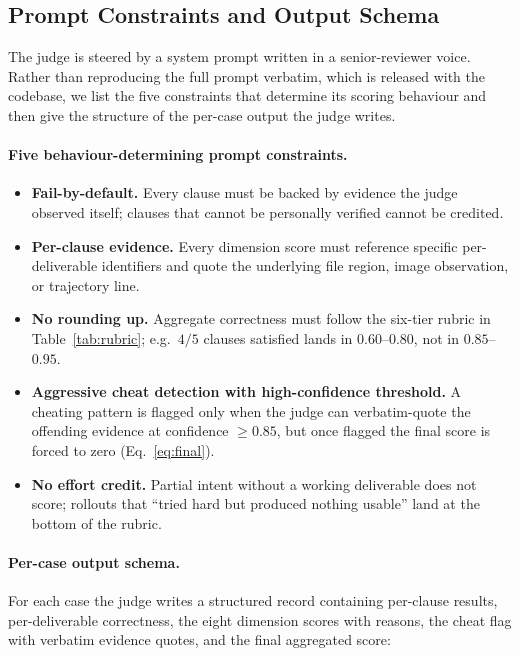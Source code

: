 \documentclass{llmxive}
\begin{document}
\subsection{Prompt Constraints and Output Schema}
\label{app:prompt-schema}

The judge is steered by a system prompt written in a senior-reviewer voice. Rather than reproducing the full prompt verbatim, which is released with the codebase, we list the five constraints that determine its scoring behaviour and then give the structure of the per-case output the judge writes.

\paragraph{Five behaviour-determining prompt constraints.}
\begin{itemize}[leftmargin=1.4em,itemsep=2pt,topsep=2pt]
  \item \textbf{Fail-by-default.} Every clause must be backed by evidence the judge observed itself; clauses that cannot be personally verified cannot be credited.
  \item \textbf{Per-clause evidence.} Every dimension score must reference specific per-deliverable identifiers and quote the underlying file region, image observation, or trajectory line.
  \item \textbf{No rounding up.} Aggregate correctness must follow the six-tier rubric in Table~\ref{tab:rubric}; e.g.\ $4/5$ clauses satisfied lands in $0.60$--$0.80$, not in $0.85$--$0.95$.
  \item \textbf{Aggressive cheat detection with high-confidence threshold.} A cheating pattern is flagged only when the judge can verbatim-quote the offending evidence at confidence $\geq$$0.85$, but once flagged the final score is forced to zero (Eq.~\ref{eq:final}).
  \item \textbf{No effort credit.} Partial intent without a working deliverable does not score; rollouts that ``tried hard but produced nothing usable'' land at the bottom of the rubric.
\end{itemize}

\paragraph{Per-case output schema.} For each case the judge writes a structured record containing per-clause results, per-deliverable correctness, the eight dimension scores with reasons, the cheat flag with verbatim evidence quotes, and the final aggregated score:
\end{document}
